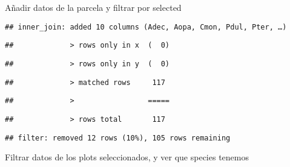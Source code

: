 \documentclass[]{article}
\newenvironment{Shaded}{\begin{snugshade}}{\end{snugshade}}
\newcommand{\DataTypeTok}[1]{\textcolor[rgb]{0.13,0.29,0.53}{#1}}
\newcommand{\KeywordTok}[1]{\textcolor[rgb]{0.13,0.29,0.53}{\textbf{#1}}}
\newcommand{\NormalTok}[1]{#1}
\newcommand{\OperatorTok}[1]{\textcolor[rgb]{0.81,0.36,0.00}{\textbf{#1}}}
\newcommand{\StringTok}[1]{\textcolor[rgb]{0.31,0.60,0.02}{#1}}
\begin{document}
Añadir datos de la parcela y filtrar por selected

\begin{Shaded}
\end{Shaded}

\begin{verbatim}
## inner_join: added 10 columns (Adec, Aopa, Cmon, Pdul, Pter, …)
\end{verbatim}

\begin{verbatim}
##             > rows only in x  (  0)
\end{verbatim}

\begin{verbatim}
##             > rows only in y  (  0)
\end{verbatim}

\begin{verbatim}
##             > matched rows     117
\end{verbatim}

\begin{verbatim}
##             >                 =====
\end{verbatim}

\begin{verbatim}
##             > rows total       117
\end{verbatim}

\begin{verbatim}
## filter: removed 12 rows (10%), 105 rows remaining
\end{verbatim}

Filtrar datos de los plots seleccionados, y ver que species tenemos

\begin{Shaded}
\end{Shaded}
\end{document}
